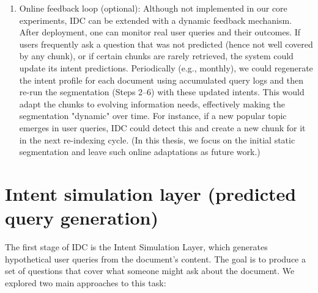 \documentclass[12pt,a4paper]{report}
\begin{document}
\begin{enumerate}
    \item Online feedback loop (optional): Although not implemented in our core experiments, IDC can be extended with a dynamic feedback mechanism. After deployment, one can monitor real user queries and their outcomes. If users frequently ask a question that was not predicted (hence not well covered by any chunk), or if certain chunks are rarely retrieved, the system could update its intent predictions. Periodically (e.g., monthly), we could regenerate the intent profile for each document using accumulated query logs and then re-run the segmentation (Steps 2--6) with these updated intents. This would adapt the chunks to evolving information needs, effectively making the segmentation "dynamic" over time. For instance, if a new popular topic emerges in user queries, IDC could detect this and create a new chunk for it in the next re-indexing cycle. (In this thesis, we focus on the initial static segmentation and leave such online adaptations as future work.)
\end{enumerate}

\section{Intent simulation layer (predicted query generation)}

The first stage of IDC is the Intent Simulation Layer, which generates hypothetical user queries from the document's content. The goal is to produce a set of questions that cover what someone might ask about the document. We explored two main approaches to this task:
\end{document}
